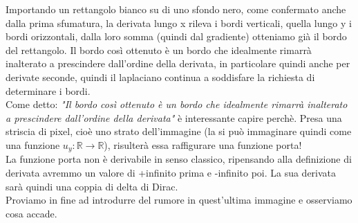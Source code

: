 Importando un rettangolo bianco su di uno sfondo nero, come confermato anche dalla prima sfumatura, la derivata lungo x rileva i bordi verticali, quella lungo y i bordi orizzontali, dalla loro somma (quindi dal gradiente) otteniamo già il bordo del rettangolo.
Il bordo così ottenuto è un bordo che idealmente rimarrà inalterato a prescindere dall'ordine della derivata, in particolare quindi anche per derivate seconde, quindi il laplaciano continua a soddisfare la richiesta di determinare i bordi. \\
Come detto: \textit{"Il bordo così ottenuto è un bordo che idealmente rimarrà inalterato a prescindere dall'ordine della derivata"} è interessante capire perchè. Presa una striscia di pixel, cioè uno strato dell'immagine (la si può immaginare quindi come una funzione $u_y:\mathbb{R} \longrightarrow \mathbb{R}$), risulterà essa raffigurare una funzione porta!\\
La funzione porta non è derivabile in senso classico, ripensando alla definizione di derivata avremmo un valore di +infinito prima e -infinito poi. La sua derivata sarà quindi una coppia di delta di Dirac.\\

\vspace{1em}
Proviamo in fine ad introdurre del rumore in quest'ultima immagine e osserviamo cosa accade.

\newpage
